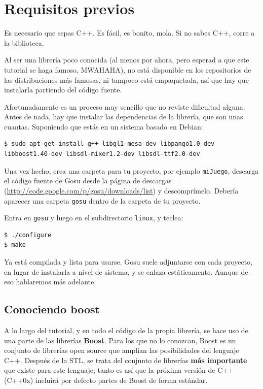 \documentclass{article}
\begin{document}
\section{Requisitos previos}
Es necesario que sepas C++. Es fácil, es bonito, mola. Si no sabes
C++, corre a la biblioteca.

Al ser una librería poco conocida (al menos por ahora, pero esperad a
que este tutorial se haga famoso, MWAHAHA), no está disponible en los
repositorios de las distribuciones más famosas, ni tampoco está
empaquetada, así que hay que instalarla partiendo del código fuente.

Afortunadamente es un proceso muy sencillo que no reviste dificultad
alguna. Antes de nada, hay que instalar las dependencias de la
librería, que son unas cuantas. Suponiendo que estás en un sistema
basado en Debian:


\begin{lstlisting}[style=consola]
$ sudo apt-get install g++ libgl1-mesa-dev libpango1.0-dev libboost1.40-dev libsdl-mixer1.2-dev libsdl-ttf2.0-dev
\end{lstlisting}

Una vez hecho, crea una carpeta para tu proyecto, por ejemplo
\texttt{miJuego}, descarga el código fuente de Gosu desde la página de
descargas (\url{http://code.google.com/p/gosu/downloads/list}) y
descomprímelo. Debería aparecer una carpeta \texttt{gosu} dentro de la
carpeta de tu proyecto.

Entra en \texttt{gosu} y luego en el subdirectorio \texttt{linux}, y
teclea:
\begin{lstlisting}[style=consola]
$ ./configure
$ make
\end{lstlisting}

Ya está compilada y lista para usarse. Gosu suele adjuntarse con cada
proyecto, en lugar de instalarla a nivel de sistema, y se enlaza
estáticamente. Aunque de eso hablaremos más adelante.

\subsection{Conociendo boost}
A lo largo del tutorial, y en todo el código de la propia librería, se
hace uso de una parte de las librerías \textbf{Boost}. Para los que no
lo conozcan, Boost es un conjunto de librerías open source que amplían
las posibilidades del lenguaje C++. Después de la STL, se trata del
conjunto de librerías \textbf{más importante} que existe para este
lenguaje; tanto es así que la próxima versión de C++ (C++0x) incluirá
por defecto partes de Boost de forma estándar.
\end{document}
